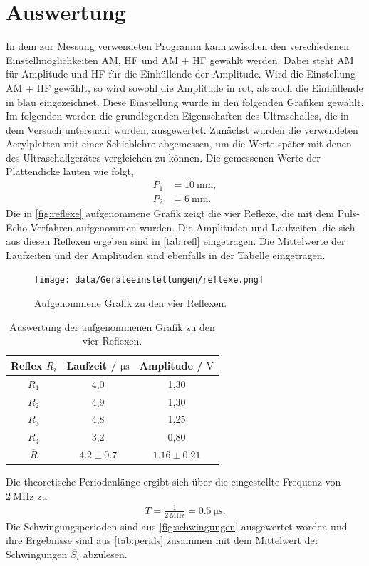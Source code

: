 \section{Auswertung}
\label{sec:Auswertung}

In dem zur Messung verwendeten Programm kann zwischen den verschiedenen Einstellmöglichkeiten AM, HF und AM + HF gewählt werden.
Dabei steht AM für Amplitude und HF für die Einhüllende der Amplitude. Wird die Einstellung AM + HF gewählt, so wird sowohl die Amplitude in rot, 
als auch die Einhüllende in blau eingezeichnet. Diese Einstellung wurde in den folgenden Grafiken gewählt. \newline
Im folgenden werden die grundlegenden Eigenschaften des Ultraschalles, die in dem Versuch untersucht wurden, ausgewertet.
Zunächst wurden die verwendeten Acrylplatten mit einer Schieblehre abgemessen, um die Werte später mit denen des Ultraschallgerätes vergleichen zu können. 
Die gemessenen Werte der Plattendicke lauten wie folgt,
\begin{align*}
  P_1 &= \SI{10}{\mm}, \\
  P_2 &= \SI{6}{\mm}.
\end{align*}
Die in \autoref{fig:reflexe} aufgenommene Grafik zeigt die vier Reflexe, die mit dem Puls-Echo-Verfahren aufgenommen wurden. Die Amplituden und Laufzeiten, 
die sich aus diesen Reflexen ergeben sind in \autoref{tab:refl} eingetragen. Die Mittelwerte der Laufzeiten und der Amplituden sind ebenfalls in der Tabelle eingetragen.

\begin{figure}[H]
  \centering
  \texttt{[image: data/Geräteeinstellungen/reflexe.png]}
  \caption{Aufgenommene Grafik zu den vier Reflexen.}
  \label{fig:reflexe}
\end{figure}

\begin{table}
  \centering
  \caption{Auswertung der aufgenommenen Grafik zu den vier Reflexen.}
  \label{tab:refl}
  \begin{tabular}{c c c}
    \toprule
    Reflex $R_i$ & Laufzeit / $\si{\micro\second}$ & Amplitude / $\si{\volt}$ \\
    \midrule
    $R_1$ & 4,0 & 1,30 \\
    $R_2$ & 4,9 & 1,30 \\
    $R_3$ & 4,8 & 1,25 \\
    $R_4$ & 3,2 & 0,80 \\
    $\overline R$ & $4.2 \pm 0.7$ & $1.16 \pm 0.21$ \\
    \bottomrule
  \end{tabular}
\end{table}
Die theoretische Periodenlänge ergibt sich über die eingestellte Frequenz von $\SI{2}{\mega\hertz}$ zu 
\begin{align*}
  T = \frac{1}{\SI{2}{\mega\hertz}} = \SI{0,5}{\micro\second}.
\end{align*}
Die Schwingungsperioden sind aus \autoref{fig:schwingungen} ausgewertet worden und ihre Ergebnisse sind aus \autoref{tab:perids} zusammen mit dem Mittelwert der Schwingungen $\overline{S_i}$ abzulesen.

